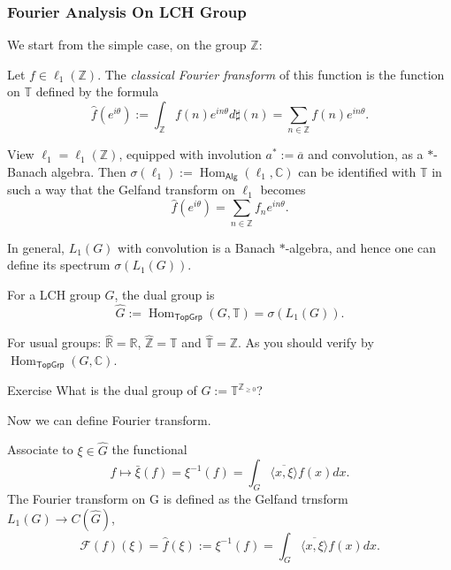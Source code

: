 \documentclass{beamer}
\def\T{\mathbb{T}}
\def\Z{\mathbb{Z}}
\def\R{\mathbb{R}}
\def\C{\mathbb{C}}
\renewcommand{\hat}\widehat
\begin{document}

\begin{frame}[allowframebreaks]
  \frametitle{Fourier Analysis On LCH Group}
We start from the simple case, on the group $\Z$:
\begin{definition}
  Let $f\in\ell_1(\Z)$. The \emph{classical Fourier fransform} of this function is the function on $\T$ defined by the formula
    \[\hat{f}(e^{i\theta}):=\int_{\Z}f(n)e^{in\theta}d\sharp(n)=\sum_{n\in\Z}f(n)e^{in\theta}.\]
\end{definition}

\begin{theorem}
  View $\ell_1=\ell_1(\mathbb Z)$, equipped with involution $a^\ast:=\overline{a}$ and convolution, as a $\ast$-Banach algebra.
  Then $\sigma(\ell_1):=\operatorname{Hom}_{\mathsf{Alg}}(\ell_1,\C)$ can be identified with $\T$ in such a way that the Gelfand transform
  on $\ell_1$ becomes
    \[\hat{f}(e^{i\theta})=\sum_{n\in\Z} f_n e^{in\theta}.\]
\end{theorem}

In general, $L_1(G)$ with convolution is a Banach $\ast$-algebra, and hence one can define its spectrum $\sigma (L_1(G))$.\cite*[Chapter~4.1]{folland2016course}
  \begin{definition}
    For a LCH group $G$, the dual group is
      \[\hat{G}:=\operatorname{Hom}_{\mathsf{TopGrp}}(G,\T)=\sigma(L_1(G)).\]
  \end{definition}
    
    \begin{example}
      For usual groups: $\hat{\R}=\R$, $\hat{\Z}=\T$ and $\hat{\T}=\Z$. As you should verify by $\operatorname{Hom}_{\mathsf{TopGrp}}(G,\C)$.
    \end{example}

    \begin{block}{Exercise}
      What is the dual group of $G:=\T^{\Z_{\geq0}}$?
    \end{block}

    \newpage

    Now we can define Fourier transform.

  \begin{definition}
    Associate to $\xi\in\hat{G}$ the functional  
    \[f\mapsto \bar{\xi}(f)=\xi^{-1}(f)=\int_G \overline{\langle x,\xi\rangle}f(x) dx.\]
      The Fourier transform on G is defined as the Gelfand trnsform $L_1(G)\to C(\hat{G})$,
      \[\mathcal{F}(f)(\xi)=\hat{f}(\xi):=\xi^{-1}(f)=\int_G \overline{\langle x,\xi\rangle}f(x)dx.\]
    \end{definition}
    

\end{frame}
\end{document}
